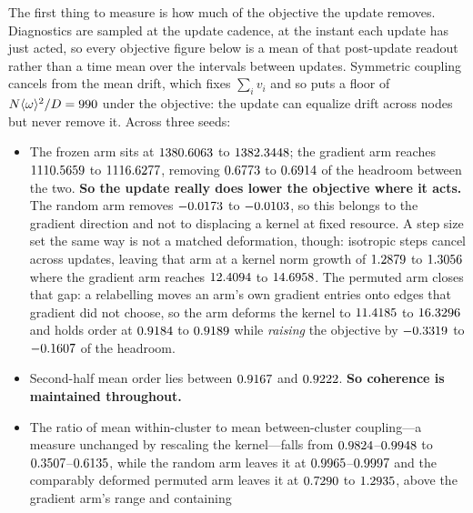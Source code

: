 \documentclass[11pt]{article}
\begin{document}
The first thing to measure is how much of the objective the update removes.
Diagnostics are sampled at the update cadence, at the instant each update has
just acted, so every objective figure below is a mean of that post-update
readout rather than a time mean over the intervals between updates. Symmetric
coupling cancels from the mean drift, which fixes $\sum_i v_i$ and so puts a
floor of $N\langle\omega\rangle^2/D=990$ under the objective:
the update can equalize drift across nodes but never remove it. Across three
seeds:
\begin{itemize}[leftmargin=*,noitemsep]
\item The frozen arm sits at $1380.6063$ to
$1382.3448$; the gradient arm reaches
$1110.5659$ to $1116.6277$, removing
$0.6773$ to $0.6914$ of the headroom between the
two. \textbf{So the update really does lower the objective where it acts.} The random
arm removes $-0.0173$ to $-0.0103$,
so this belongs to the gradient direction and not to displacing a kernel at
fixed resource. A step size set the same way is not a matched deformation, though:
isotropic steps cancel across updates, leaving that arm at a kernel norm growth
of $1.2879$ to $1.3056$ where
the gradient arm reaches $12.4094$ to
$14.6958$. The permuted arm closes that gap: a relabelling
moves an arm's own gradient entries onto edges that gradient did not choose, so
the arm deforms the kernel to $11.4185$ to
$16.3296$ and holds order at
$0.9184$ to $0.9189$ while
\emph{raising} the objective by $-0.3319$ to
$-0.1607$ of the headroom.
\item Second-half mean order lies between $0.9167$ and
$0.9222$. \textbf{So coherence is maintained throughout.}
\item The ratio of mean within-cluster to mean between-cluster coupling---a
measure unchanged by rescaling the kernel---falls from
$0.9824$--$0.9948$ to
$0.3507$--$0.6135$, while the random arm leaves it at
$0.9965$--$0.9997$ and the comparably
deformed permuted arm leaves it at $0.7290$ to
$1.2935$, above the gradient arm's range and containing

\end{itemize}
\end{document}

